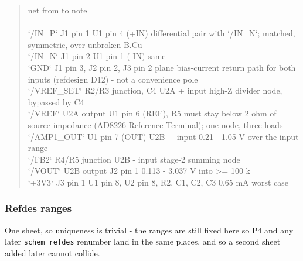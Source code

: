\documentclass[11pt,a4paper]{article}
\begin{document}
\begin{quote}\small\ttfamily\raggedright
\textbar{} net \textbar{} from \textbar{} to \textbar{} note \textbar{}\\
\textbar{}---\textbar{}---\textbar{}---\textbar{}---\textbar{}\\
\textbar{} `/IN\_P` \textbar{} J1 pin 1 \textbar{} U1 pin 4 (+IN) \textbar{} differential pair with `/IN\_N`; matched, symmetric, over unbroken B.Cu \textbar{}\\
\textbar{} `/IN\_N` \textbar{} J1 pin 2 \textbar{} U1 pin 1 (-IN) \textbar{} same \textbar{}\\
\textbar{} `GND` \textbar{} J1 pin 3, J2 pin 2, J3 pin 2 \textbar{} plane \textbar{} bias-current return path for both inputs (refdesign D12) - not a convenience pole \textbar{}\\
\textbar{} `/VREF\_SET` \textbar{} R2/R3 junction, C4 \textbar{} U2A + input \textbar{} high-Z divider node, bypassed by C4 \textbar{}\\
\textbar{} `/VREF` \textbar{} U2A output \textbar{} U1 pin 6 (REF), R5 \textbar{} must stay below 2 ohm of source impedance (AD8226 Reference Terminal); one node, three loads \textbar{}\\
\textbar{} `/AMP1\_OUT` \textbar{} U1 pin 7 (OUT) \textbar{} U2B + input \textbar{} 0.21 - 1.05 V over the input range \textbar{}\\
\textbar{} `/FB2` \textbar{} R4/R5 junction \textbar{} U2B - input \textbar{} stage-2 summing node \textbar{}\\
\textbar{} `/VOUT` \textbar{} U2B output \textbar{} J2 pin 1 \textbar{} 0.113 - 3.037 V into \textgreater{}= 100 k \textbar{}\\
\textbar{} `+3V3` \textbar{} J3 pin 1 \textbar{} U1 pin 8, U2 pin 8, R2, C1, C2, C3 \textbar{} 0.65 mA worst case \textbar{}
\end{quote}
\subsubsection*{Refdes ranges}
One sheet, so uniqueness is trivial - the ranges are still fixed here so P4 and any later \texttt{schem\_refdes} renumber land in the same places, and so a second sheet added later cannot collide.
\end{document}
